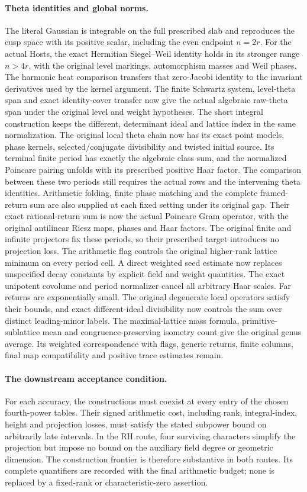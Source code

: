 \paragraph{Theta identities and global norms.}
The literal Gaussian is integrable on the full prescribed slab and
reproduces the cusp space with its positive scalar, including the
even endpoint $n=2r$. For the actual Hosts, the exact Hermitian
Siegel--Weil identity holds in its stronger range $n>4r$, with the
original level markings, automorphism masses and Weil phases.
The harmonic heat comparison transfers that zero-Jacobi identity
to the invariant derivatives used by the kernel argument. The finite
Schwartz system, level-theta span and exact identity-cover transfer
now give the actual algebraic raw-theta span under the original
level and weight hypotheses. The short integral construction keeps the
different, determinant ideal and lattice index in the same normalization.
The original local theta chain now has its exact point models,
phase kernels, selected/conjugate divisibility and twisted initial source.
Its terminal finite period has exactly the algebraic class sum, and
the normalized Poincare pairing unfolds with its prescribed positive
Haar factor. The comparison between these two periods still requires
the actual rows and the intervening theta identities.
Arithmetic folding, finite phase matching
and the complete framed-return sum are also supplied at each fixed
setting under its original gap. Their exact rational-return sum is now
the actual Poincare Gram operator, with the original antilinear Riesz
maps, phases and Haar factors. The original finite and infinite
projectors fix these periods, so their prescribed target introduces
no projection loss. The arithmetic flag controls the
original higher-rank lattice minimum on every period cell. A direct
weighted seed estimate now replaces unspecified decay constants by
explicit field and weight quantities. The exact unipotent covolume and
period normalizer cancel all arbitrary Haar scales. Far returns are
exponentially small. The original degenerate local operators satisfy
their bounds, and exact different-ideal divisibility now controls the
sum over distinct leading-minor labels. The maximal-lattice mass
formula, primitive-sublattice mean and congruence-preserving isometry
count give the original genus average. Its weighted correspondence
with flags, generic returns, finite columns, final map compatibility
and positive trace estimates remain.

\paragraph{The downstream acceptance condition.}
For each accuracy, the constructions must coexist at every entry of
the chosen fourth-power tables. Their signed arithmetic cost, including
rank, integral-index, height and projection losses, must satisfy the
stated subpower bound on arbitrarily late intervals. In the RH route,
four surviving characters simplify the projection but impose no bound
on the auxiliary field degree or geometric dimension. The construction
frontier is therefore substantive in both routes. Its complete
quantifiers are recorded with the final arithmetic budget; none is
replaced by a fixed-rank or characteristic-zero assertion.
